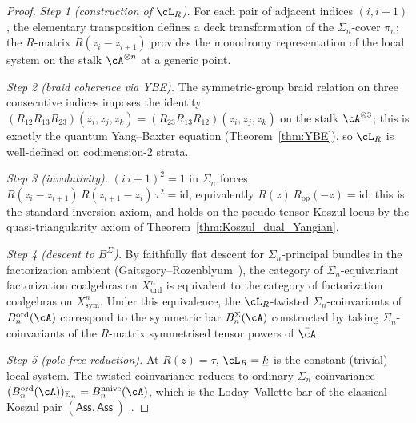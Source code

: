\begin{proof}
\textit{Step 1 (construction of $\cL_R$).} For each pair of
adjacent indices $(i, i{+}1)$, the elementary transposition
defines a deck transformation of the $\Sigma_n$-cover
$\pi_n$; the $R$-matrix $R(z_i - z_{i+1})$ provides the
monodromy representation of the local system on the stalk
$\cA^{\otimes n}$ at a generic point.

\textit{Step 2 (braid coherence via YBE).} The symmetric-group
braid relation on three consecutive indices imposes the
identity
$(R_{12} R_{13} R_{23})(z_i, z_j, z_k)
 = (R_{23} R_{13} R_{12})(z_i, z_j, z_k)$
on the stalk $\cA^{\otimes 3}$; this is exactly the quantum
Yang--Baxter equation (Theorem~\ref{thm:YBE}), so $\cL_R$ is
well-defined on codimension-$2$ strata.

\textit{Step 3 (involutivity).} $(i\,i{+}1)^2 = 1$ in $\Sigma_n$
forces $R(z_i - z_{i+1})\,R(z_{i+1} - z_i)\,\tau^2 = \mathrm{id}$,
equivalently $R(z)\,R_{\mathrm{op}}(-z) = \mathrm{id}$; this is the
standard inversion axiom, and holds on the pseudo-tensor
Koszul locus by the quasi-triangularity axiom of
Theorem~\ref{thm:Koszul_dual_Yangian}.

\textit{Step 4 (descent to $B^\Sigma$).} By faithfully flat descent
for $\Sigma_n$-principal bundles in the factorization ambient
(Gaitsgory--Rozenblyum~\cite[IV.5.4]{GR17}), the category of
$\Sigma_n$-equivariant factorization coalgebras on
$X^n_{\mathrm{ord}}$ is equivalent to the category of
factorization coalgebras on $X^n_{\mathrm{sym}}$. Under this
equivalence, the $\cL_R$-twisted $\Sigma_n$-coinvariants of
$B^{\mathrm{ord}}_n(\cA)$ correspond to the symmetric bar
$B^{\Sigma}_n(\cA)$ constructed by taking $\Sigma_n$-coinvariants
of the $R$-matrix symmetrised tensor powers of $\bar\cA$.

\textit{Step 5 (pole-free reduction).} At $R(z) = \tau$,
$\cL_R = \underline{k}$ is the constant (trivial) local system.
The twisted coinvariance reduces to ordinary
$\Sigma_n$-coinvariance
$(B^{\mathrm{ord}}_n(\cA))_{\Sigma_n} = B^{\mathrm{naive}}_n(\cA)$,
which is the Loday--Vallette bar of the classical Koszul pair
$(\mathsf{Ass}, \mathsf{Ass}^!)$~\cite{LV12}.
\end{proof}

